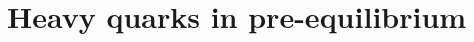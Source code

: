 \documentclass[aspectratio=169,11pt,usenames,dvipsnames]{beamer}
\begin{document}




\section{{\color{jyublue}Heavy quarks} in pre-equilibrium}
\end{document}
